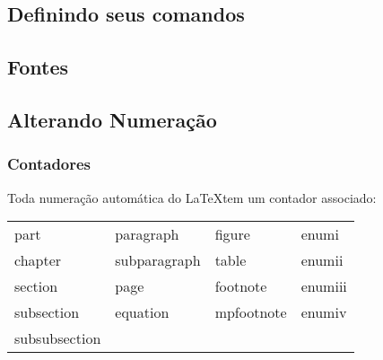 \documentclass{beamer}
\newenvironment{fblock}{\vspace{8pt}\begin{boxedminipage}{\textwidth}}{\end{boxedminipage}\vspace{8pt}}
\begin{document}
% 
% 
% 
% 
% 
% 



\subsection{Definindo seus comandos}

\subsection{Fontes}

\subsection{Alterando Numeração}

\begin{frame}[fragile]
\frametitle{Contadores}

Toda numeração automática do \LaTeX tem um contador associado:
\begin{center}

\begin{tabular}{llll}

 part & paragraph & figure & enumi \\ 
chapter & subparagraph & table & enumii \\ 
section & page & footnote & enumiii \\ 
subsection & equation & mpfootnote & enumiv \\ 
subsubsection &  &  & 
\end{tabular}
\end{center}
\end{frame}
\end{document}
